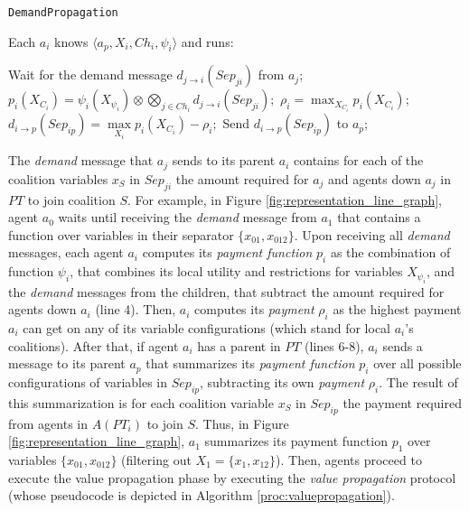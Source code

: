 \documentclass[11pt, twoside, titlepage, a4paper, openright]{report}
\begin{document}
\begin{algorithm}[!h]
\caption{\texttt{DemandPropagation}} 
\small Each $a_i$ knows $\langle a_p, X_i,
Ch_i,\psi_i\rangle$ and runs:\normalsize
\small
 \begin{algorithmic}[1] 
        \State Wait for the demand message $d_{j \rightarrow i}(Sep_{ji})$ from
        $a_j$;
    \EndFor
     \State $p_i(X_{C_i}) =  \psi_i(X_{\psi_i}) \otimes \bigotimes_{j \in Ch_i}
     d_{j \rightarrow i}(Sep_{ji});$ 
     \State $\rho_i = \max_{X_{C_i}} p_i(X_{C_i});$
    	\State $d_{i \rightarrow p}(Sep_{ip})= \max\limits_{X_i}
    	p_i(X_{C_i}) - \rho_i ;$ 
    	 \State Send $d_{i\rightarrow p}(Sep_{ip})$ to $a_p$;
    \EndIf
\end{algorithmic}
\label{proc:demandpropagation}
\end{algorithm}

\noindent The \emph{demand} message that $a_j$ sends to its parent $a_i$
contains for each of the coalition variables $x_S$ in $Sep_{ji}$ the amount
required for $a_j$ and agents down $a_j$ in $PT$ to join coalition $S$. For
example, in Figure \ref{fig:representation_line_graph}, agent $a_0$ waits until
receiving the \emph{demand} message from $a_1$ that contains a function over
variables in their separator $\{x_{01},x_{012}\}$. Upon receiving all
\emph{demand} messages, each agent $a_i$ computes its \emph{payment function}
$p_i$ as the combination of function $\psi_i$, that combines its local utility
and restrictions for variables $X_{\psi_i}$, and the \emph{demand} messages from
the children, that subtract the amount required for agents down $a_i$ (line 4).
Then, $a_i$ computes its \emph{payment} $\rho_i$ as the highest payment $a_i$
can get on any of its variable configurations (which stand for local $a_i$'s
coalitions). After that, if agent $a_i$ has a parent in $PT$ (lines 6-8), $a_i$
sends a message to its parent $a_p$ that summarizes its \emph{payment function}
$p_i$ over all possible configurations of variables in $Sep_{ip}$, subtracting its own
\emph{payment} $\rho_i$. The result of this summarization is for each coalition
variable $x_S$ in $Sep_{ip}$ the payment required from agents in $A(PT_i)$ to
join $S$. Thus, in Figure \ref{fig:representation_line_graph}, $a_1$ summarizes
its payment function $p_1$ over variables $\{x_{01},x_{012}\}$ (filtering out
$X_1=\{x_1,x_{12}\}$). Then, agents proceed to execute the value propagation
phase by executing the \emph{value propagation} protocol (whose pseudocode is depicted in
Algorithm \ref{proc:valuepropagation}).
\end{document}
